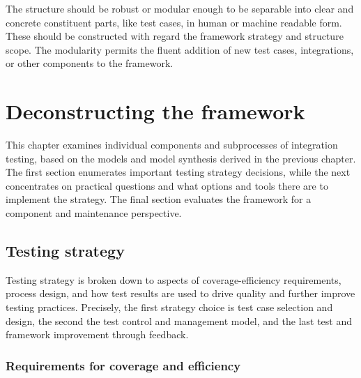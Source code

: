 \documentclass[12pt,a4paper,oneside,pdftex]{report}
\begin{document}
The structure should be robust or modular enough to be separable into clear and concrete constituent parts, like test cases, in human or machine readable form. These should be constructed with regard the framework strategy and structure scope. The modularity permits the fluent addition of new test cases, integrations, or other components to the framework.

\begin{comment}
The testing process can vary in its mode of execution or degree of automation. In what is perhaps the most extreme case, test case are run automatically every time a change is committed to system source code. This approach is called continuous integration (CI). 
\end{comment}


\chapter{Deconstructing the framework}
\label{chapter:frameworkanalysis}

This chapter examines individual components and subprocesses of integration testing, based on the models and model synthesis derived in the previous chapter. The first section enumerates important testing strategy decisions, while the next concentrates on practical questions and what options and tools there are to implement the strategy. The final section evaluates the framework for a component and maintenance perspective.

\section{Testing strategy}

Testing strategy is broken down to aspects of coverage-efficiency requirements, process design, and how test results are used to drive quality and further improve testing practices. Precisely, the first strategy choice is test case selection and design, the second the test control and management model, and the last test and framework improvement through feedback. %

\subsection{Requirements for coverage and efficiency}
\end{document}
